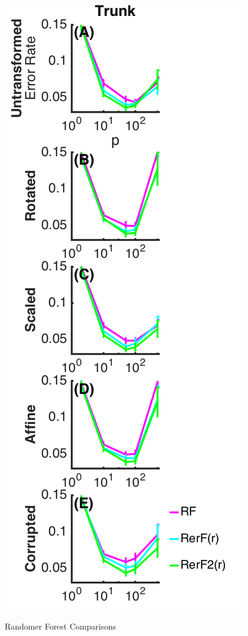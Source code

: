 \documentclass[simplex.tex]{subfiles}
\begin{document}
\begin{figure}[h!]
\begin{cframed}
\includegraphics[height=0.5\textheight]{./figs/RefF2.png}
\label{fig:RefF1}
\caption{
 Randomer Forest Comparisons
}
\end{cframed}
\end{figure}
\end{document}
